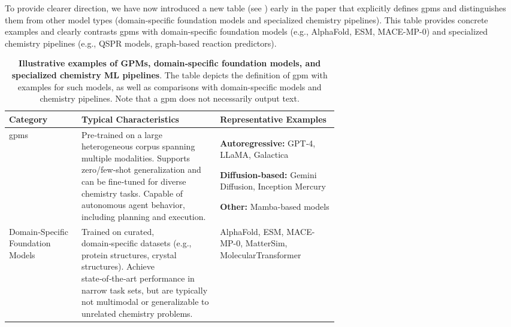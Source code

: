 \begin{reply}
\label{reply:gpm_definition}
 To provide clearer direction, we have now introduced a new table (see ) early in the paper that explicitly defines \glspl{gpm} and distinguishes them from other model types (domain-specific foundation models and specialized chemistry pipelines). This table provides concrete examples and clearly contrasts \glspl{gpm} with domain-specific foundation models (e.g., AlphaFold,\autocite{AlphaFold2021} ESM,\autocite{lin2022language} MACE-MP-0\autocite{batatia2023foundation}) and specialized chemistry pipelines (e.g., QSPR models, graph-based reaction predictors).

\begin{table}[H]
    \centering
    \caption{\textbf{Illustrative examples of GPMs, domain‑specific foundation models, and specialized chemistry ML pipelines}. The table depicts the definition of \gls{gpm} with examples for such models, as well as comparisons with domain-specific models and chemistry pipelines. Note that a \gls{gpm} does not necessarily output text.}
    \label{tab:gpm}
    \begin{tabularx}{\linewidth}{@{}p{0.22\linewidth} p{0.42\linewidth} X@{}}
        \toprule
        \textbf{Category} & \textbf{Typical Characteristics} & \textbf{Representative Examples} \\
        \midrule
        \addlinespace[0.3em]
        
        \glspl{gpm} &
        Pre‑trained on a large heterogeneous corpus spanning multiple modalities. Supports zero/few‑shot generalization and can be fine‑tuned for diverse chemistry tasks. Capable of autonomous agent behavior, including planning and execution. &
        \textbf{Autoregressive:} GPT‑4,\autocite{openai2023gpt04} LLaMA,\autocite{grattafiori2024llama} Galactica\autocite{taylor2022galactica}
        
        \textbf{Diffusion-based:} Gemini Diffusion,\autocite{deepmind_geminidiffusion_2025} Inception Mercury\autocite{inceptionlabs2025mercury0}
        
        \textbf{Other:} Mamba-based\autocite{gu2023mamba0} models \\
        
        \addlinespace[0.8em]
        \midrule
        \addlinespace[0.3em]
        
        Domain‑Specific Foundation Models &
        Trained on curated, domain‑specific datasets (e.g., protein structures, crystal structures). Achieve state‑of‑the‑art performance in narrow task sets, but are typically not multimodal or generalizable to unrelated chemistry problems. &
        AlphaFold,\autocite{AlphaFold2021} ESM,\autocite{lin2022language} MACE-MP-0\autocite{batatia2023foundation}, MatterSim\autocite{yang2024mattersim}, MolecularTransformer\autocite{schwaller2019molecular} \\
        

\end{tabularx}
\end{table}
\end{reply}
